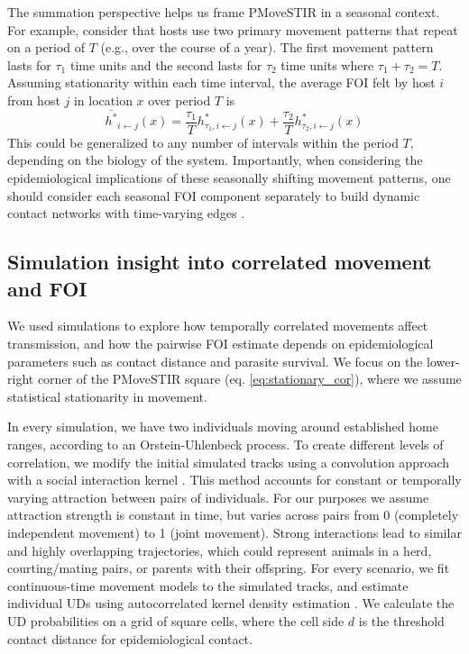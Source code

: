 \documentclass[letterpaper]{article}
\begin{document}
The summation perspective helps us frame PMoveSTIR in a seasonal context.  For example, consider that hosts use two primary movement patterns that repeat on a period of $T$ (e.g., over the course of a year).  The first movement pattern lasts for $\tau_1$ time units and the second lasts for $\tau_2$ time units where $\tau_1 + \tau_2 = T$.  Assuming stationarity within each time interval, the average FOI felt by host $i$ from host $j$ in location $x$ over period $T$ is 
\begin{equation}
\bar{h^*}_{i \leftarrow j}(x) = \frac{\tau_1}{T} h^*_{\tau_1, i \leftarrow j}(x) + \frac{\tau_2}{T} h^*_{\tau_2, i \leftarrow j}(x)
\label{eq:seasonal}
\end{equation}
This could be generalized to any number of intervals within the period $T$, depending on the biology of the system.  Importantly, when considering the epidemiological implications of these seasonally shifting movement patterns, one should consider each seasonal FOI component separately to build dynamic contact networks with time-varying edges \citep{Wilber2022}.


\subsection*{Simulation insight into correlated movement and FOI}

We used simulations to explore how temporally correlated movements affect  transmission, and how the pairwise FOI estimate depends on epidemiological parameters such as contact distance and parasite survival. We focus on the lower-right corner of the PMoveSTIR square (eq. \ref{eq:stationary_cor}), where we assume statistical stationarity in movement. 

In every simulation, we have two individuals moving around established home ranges, according to an Orstein-Uhlenbeck process. To create different levels of correlation, we modify the initial simulated tracks using a convolution approach with a social interaction kernel \citep{Scharf2018}. This method accounts for constant or temporally varying attraction between pairs of individuals. For our purposes we assume attraction strength is constant in time, but varies across pairs from 0 (completely independent movement) to 1 (joint movement). Strong interactions lead to similar and highly overlapping trajectories, which could represent animals in a herd, courting/mating pairs, or parents with their offspring.
For every scenario, we fit continuous-time movement models to the simulated tracks, and estimate individual UDs using autocorrelated kernel density estimation \citep{Calabrese2016}. We calculate the UD probabilities on a grid of square cells, where the cell side $d$ is the threshold contact distance for epidemiological contact. 
\end{document}
